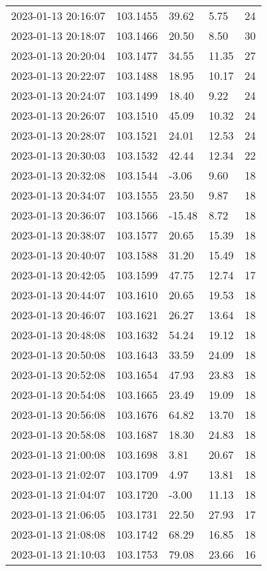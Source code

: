 \documentclass{nature_plusfigure}
\begin{document}
\begin{supplement}
\begin{center}
\begin{longtable}{lllll}
2023-01-13 20:16:07 & 103.1455 & 39.62 & 5.75 & 24 \\ 
2023-01-13 20:18:07 & 103.1466 & 20.50 & 8.50 & 30 \\ 
2023-01-13 20:20:04 & 103.1477 & 34.55 & 11.35 & 27 \\ 
2023-01-13 20:22:07 & 103.1488 & 18.95 & 10.17 & 24 \\ 
2023-01-13 20:24:07 & 103.1499 & 18.40 & 9.22 & 24 \\ 
2023-01-13 20:26:07 & 103.1510 & 45.09 & 10.32 & 24 \\ 
2023-01-13 20:28:07 & 103.1521 & 24.01 & 12.53 & 24 \\ 
2023-01-13 20:30:03 & 103.1532 & 42.44 & 12.34 & 22 \\ 
2023-01-13 20:32:08 & 103.1544 & -3.06 & 9.60 & 18 \\ 
2023-01-13 20:34:07 & 103.1555 & 23.50 & 9.87 & 18 \\ 
2023-01-13 20:36:07 & 103.1566 & -15.48 & 8.72 & 18 \\ 
2023-01-13 20:38:07 & 103.1577 & 20.65 & 15.39 & 18 \\ 
2023-01-13 20:40:07 & 103.1588 & 31.20 & 15.49 & 18 \\ 
2023-01-13 20:42:05 & 103.1599 & 47.75 & 12.74 & 17 \\ 
2023-01-13 20:44:07 & 103.1610 & 20.65 & 19.53 & 18 \\ 
2023-01-13 20:46:07 & 103.1621 & 26.27 & 13.64 & 18 \\ 
2023-01-13 20:48:08 & 103.1632 & 54.24 & 19.12 & 18 \\ 
2023-01-13 20:50:08 & 103.1643 & 33.59 & 24.09 & 18 \\ 
2023-01-13 20:52:08 & 103.1654 & 47.93 & 23.83 & 18 \\ 
2023-01-13 20:54:08 & 103.1665 & 23.49 & 19.09 & 18 \\ 
2023-01-13 20:56:08 & 103.1676 & 64.82 & 13.70 & 18 \\ 
2023-01-13 20:58:08 & 103.1687 & 18.30 & 24.83 & 18 \\ 
2023-01-13 21:00:08 & 103.1698 & 3.81 & 20.67 & 18 \\ 
2023-01-13 21:02:07 & 103.1709 & 4.97 & 13.81 & 18 \\ 
2023-01-13 21:04:07 & 103.1720 & -3.00 & 11.13 & 18 \\ 
2023-01-13 21:06:05 & 103.1731 & 22.50 & 27.93 & 17 \\ 
2023-01-13 21:08:08 & 103.1742 & 68.29 & 16.85 & 18 \\ 
2023-01-13 21:10:03 & 103.1753 & 79.08 & 23.66 & 16 \\ 

\end{longtable}
\end{center}
\end{supplement}
\end{document}
